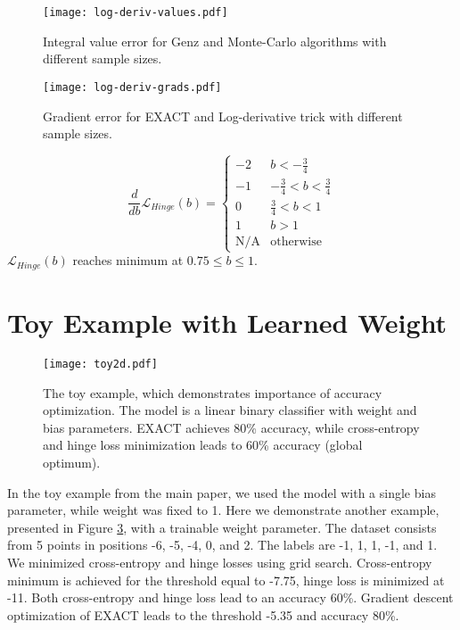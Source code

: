 \documentclass[nohyperref]{article}
\theoremstyle{plain}
\theoremstyle{definition}
\theoremstyle{remark}
\begin{document}
\begin{figure}[t]
\centering
\texttt{[image: log-deriv-values.pdf]}
\caption{Integral value error for Genz and Monte-Carlo algorithms with different sample sizes.}
\label{fig:mc_vs_genz_val}
\vskip -0.2in
\end{figure}

\begin{figure}[t]
\centering
\texttt{[image: log-deriv-grads.pdf]}
\caption{Gradient error for EXACT and Log-derivative trick with different sample sizes.}
\label{fig:mc_vs_genz_grad}
\vskip -0in
\end{figure}

\begin{equation}
\frac{d}{db}\mathcal{L}_{Hinge}(b) = \begin{cases}-2 & b<-\frac{3}{4} \\ -1 & -\frac{3}{4}<b<\frac{3}{4} \\ 0 & \frac{3}{4}<b<1 \\ 1 & b>1 \\ \text{N/A}& \text{otherwise} \end{cases}
\end{equation}
$\mathcal{L}_{Hinge}(b)$ reaches minimum at $0.75 \le b \le 1$.

\section{Toy Example with Learned Weight}

\begin{figure}[t]
\vskip 0.2in
\centering
\texttt{[image: toy2d.pdf]}
\caption{The toy example, which demonstrates importance of accuracy optimization. The model is a linear binary classifier with weight and bias parameters. EXACT achieves 80\% accuracy, while cross-entropy and hinge loss minimization leads to 60\% accuracy (global optimum).}
\label{fig:toy2d}
\vskip -0.2in
\end{figure}

In the toy example from the main paper, we used the model with a single bias parameter, while weight was fixed to 1. Here we demonstrate another example, presented in Figure \ref{fig:toy2d}, with a trainable weight parameter. The dataset consists from 5 points in positions -6, -5, -4, 0, and 2. The labels are -1, 1, 1, -1, and 1. We minimized cross-entropy and hinge losses using grid search. Cross-entropy minimum is achieved for the threshold equal to -7.75, hinge loss is minimized at -11. Both cross-entropy and hinge loss lead to an accuracy 60\%. Gradient descent optimization of EXACT leads to the threshold -5.35 and accuracy 80\%.
\end{document}
